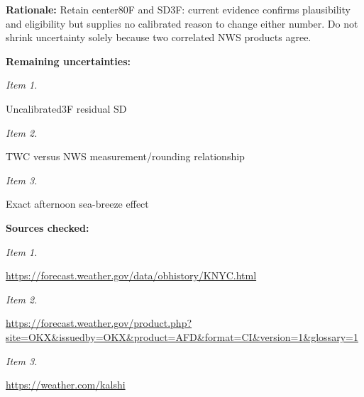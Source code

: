 \documentclass[11pt]{article}
\begin{document}
\par\noindent\textbf{Rationale:} Retain center80F and SD3F: current evidence confirms plausibility and eligibility but supplies no calibrated reason to change either number. Do not shrink uncertainty solely because two correlated NWS products agree.

\par\noindent\textbf{Remaining uncertainties:} \par \par\noindent\textit{Item 1.}\par Uncalibrated3F residual SD

\par\noindent\textit{Item 2.}\par TWC versus NWS measurement/rounding relationship

\par\noindent\textit{Item 3.}\par Exact afternoon sea-breeze effect

\par\noindent\textbf{Sources checked:} \par \par\noindent\textit{Item 1.}\par \href{https://forecast.weather.gov/data/obhistory/KNYC.html}{https://fore\hspace{0pt}cast.weather\hspace{0pt}.gov/data/ob\hspace{0pt}history/KNYC\hspace{0pt}.html}

\par\noindent\textit{Item 2.}\par \href{https://forecast.weather.gov/product.php?site=OKX\&issuedby=OKX\&product=AFD\&format=CI\&version=1\&glossary=1}{https://fore\hspace{0pt}cast.weather\hspace{0pt}.gov/product\hspace{0pt}.php?site=OK\hspace{0pt}X\&issuedby=O\hspace{0pt}KX\&product=A\hspace{0pt}FD\&format=CI\hspace{0pt}\&version=1\&g\hspace{0pt}lossary=1}

\par\noindent\textit{Item 3.}\par \href{https://weather.com/kalshi}{https://weather.com/kalshi}
\end{document}
